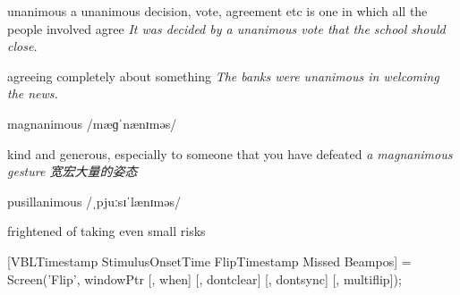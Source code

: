 \begin{DefWord}{unanimous}
    a unanimous decision, vote, agreement etc is one in which all the people involved agree
    \textit{It was decided by a unanimous vote that the school should close.}

    agreeing completely about something
    \textit{The banks were unanimous in welcoming the news.}
\end{DefWord}

\begin{DefWord}{magnanimous}
    /mæɡˈnænɪməs/

    kind and generous, especially to someone that you have defeated
    \textit{a magnanimous gesture 宽宏大量的姿态}
\end{DefWord}

\begin{DefWord}{pusillanimous}
    /ˌpjuːsɪˈlænɪməs/
    
    frightened of taking even small risks
\end{DefWord}

[VBLTimestamp StimulusOnsetTime FlipTimestamp Missed Beampos] = Screen('Flip', windowPtr [, when] [, dontclear] [, dontsync] [, multiflip]);

